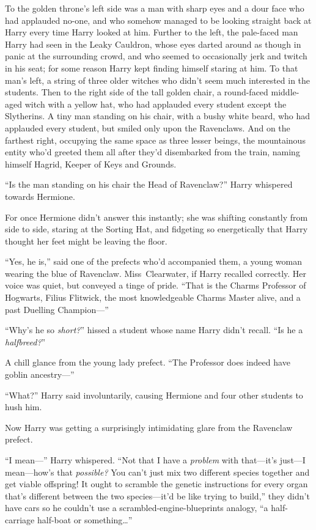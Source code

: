 To the golden throne’s left side was a man with sharp eyes and a dour face who had applauded no-one, and who somehow managed to be looking straight back at Harry every time Harry looked at him. Further to the left, the pale-faced man Harry had seen in the Leaky Cauldron, whose eyes darted around as though in panic at the surrounding crowd, and who seemed to occasionally jerk and twitch in his seat; for some reason Harry kept finding himself staring at him. To that man’s left, a string of three older witches who didn’t seem much interested in the students. Then to the right side of the tall golden chair, a round-faced middle-aged witch with a yellow hat, who had applauded every student except the Slytherins. A tiny man standing on his chair, with a bushy white beard, who had applauded every student, but smiled only upon the Ravenclaws. And on the farthest right, occupying the same space as three lesser beings, the mountainous entity who’d greeted them all after they’d disembarked from the train, naming himself Hagrid, Keeper of Keys and Grounds.

“Is the man standing on his chair the Head of Ravenclaw?” Harry whispered towards Hermione.

For once Hermione didn’t answer this instantly; she was shifting constantly from side to side, staring at the Sorting Hat, and fidgeting so energetically that Harry thought her feet might be leaving the floor.

“Yes, he is,” said one of the prefects who’d accompanied them, a young woman wearing the blue of Ravenclaw. Miss~Clearwater, if Harry recalled correctly. Her voice was quiet, but conveyed a tinge of pride. “That is the Charms Professor of Hogwarts, Filius Flitwick, the most knowledgeable Charms Master alive, and a past Duelling Champion—”

“Why’s he so \emph{short?}” hissed a student whose name Harry didn’t recall. “Is he a \emph{halfbreed?}”

A chill glance from the young lady prefect. “The Professor does indeed have goblin ancestry—”

“What?” Harry said involuntarily, causing Hermione and four other students to hush him.

Now Harry was getting a surprisingly intimidating glare from the Ravenclaw prefect.

“I mean—” Harry whispered. “Not that I have a \emph{problem} with that—it’s just—I mean—how’s that \emph{possible?} You can’t just mix two different species together and get viable offspring! It ought to scramble the genetic instructions for every organ that’s different between the two species—it’d be like trying to build,” they didn’t have cars so he couldn’t use a scrambled-engine-blueprints analogy, “a half-carriage half-boat or something…”

